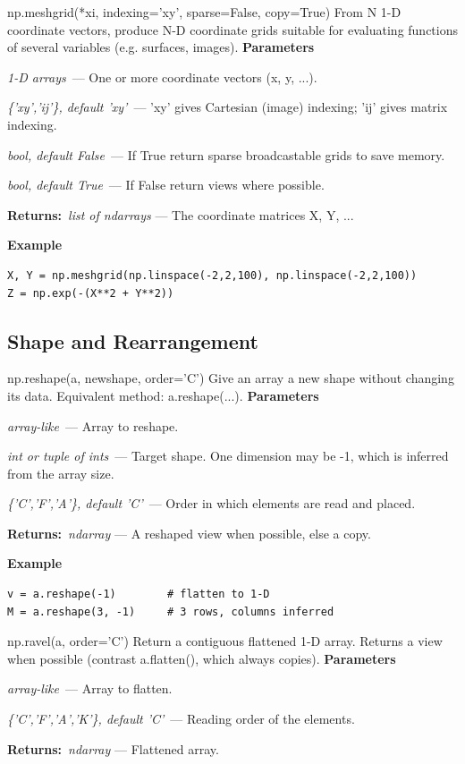 \documentclass[10pt]{article}
\newenvironment{params}
  {\smallskip\textbf{\small\color{accent}Parameters}\par\nopagebreak
   \begin{description}[leftmargin=1.3em,itemsep=1.5pt,parsep=0pt,topsep=1pt,
      labelindent=0pt,style=sameline,font=\normalfont]}
  {\end{description}}
\newcommand{\pitem}[3]{\item[{\ttfamily\color{accent}#1}]{\itshape #2}\ --- #3}
\newcommand{\preturn}[2]{\smallskip\textbf{\small\color{accent}Returns:}\ {\itshape #1} --- #2\par}
\begin{document}
\begin{func}{np.meshgrid(*xi, indexing='xy', sparse=False, copy=True)}
From N 1-D coordinate vectors, produce N-D coordinate grids suitable for evaluating functions of several variables (e.g. surfaces, images).
\begin{params}
\pitem{xi}{1-D arrays}{One or more coordinate vectors (x, y, ...).}
\pitem{indexing}{\{'xy','ij'\}, default 'xy'}{'xy' gives Cartesian (image) indexing; 'ij' gives matrix indexing.}
\pitem{sparse}{bool, default False}{If True return sparse broadcastable grids to save memory.}
\pitem{copy}{bool, default True}{If False return views where possible.}
\end{params}
\preturn{list of ndarrays}{The coordinate matrices X, Y, ...}
\smallskip\textbf{\small\color{accent}Example}
\begin{lstlisting}[style=py]
X, Y = np.meshgrid(np.linspace(-2,2,100), np.linspace(-2,2,100))
Z = np.exp(-(X**2 + Y**2))
\end{lstlisting}
\end{func}
\medskip

\subsection{Shape and Rearrangement}
\begin{func}{np.reshape(a, newshape, order='C')}
Give an array a new shape without changing its data. Equivalent method: a.reshape(...).
\begin{params}
\pitem{a}{array-like}{Array to reshape.}
\pitem{newshape}{int or tuple of ints}{Target shape. One dimension may be -1, which is inferred from the array size.}
\pitem{order}{\{'C','F','A'\}, default 'C'}{Order in which elements are read and placed.}
\end{params}
\preturn{ndarray}{A reshaped view when possible, else a copy.}
\smallskip\textbf{\small\color{accent}Example}
\begin{lstlisting}[style=py]
v = a.reshape(-1)        # flatten to 1-D
M = a.reshape(3, -1)     # 3 rows, columns inferred
\end{lstlisting}
\end{func}
\medskip

\begin{func}{np.ravel(a, order='C')}
Return a contiguous flattened 1-D array. Returns a view when possible (contrast a.flatten(), which always copies).
\begin{params}
\pitem{a}{array-like}{Array to flatten.}
\pitem{order}{\{'C','F','A','K'\}, default 'C'}{Reading order of the elements.}
\end{params}
\preturn{ndarray}{Flattened array.}
\end{func}
\medskip
\end{document}
